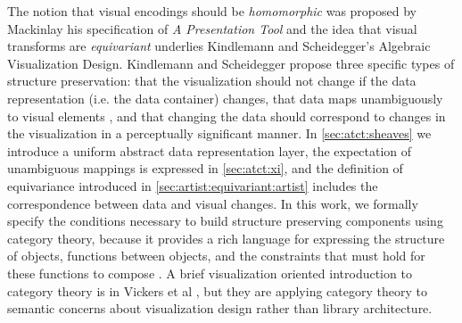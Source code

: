 \documentclass[10pt,journal,compsoc]{IEEEtran}
\theoremstyle{definition}
\theoremstyle{remark}
\begin{document}
The notion that visual encodings should be \textit{homomorphic} was proposed by Mackinlay\cite{mackinlayAutomaticDesignGraphical1987} his specification of \textit{A Presentation Tool} and the idea that visual transforms are \textit{equivariant} underlies Kindlemann and Scheidegger\cite{kindlmannAlgebraicProcessVisualization2014}'s Algebraic Visualization Design. Kindlemann and Scheidegger propose three specific types of structure preservation: that the visualization should not change if the data representation (i.e. the data container) changes, that data maps unambiguously to visual elements \cite{ziemkiewiczEmbeddingInformationVisualization2009}, and that changing the data should correspond to changes in the visualization in a perceptually significant manner. In \autoref{sec:atct:sheaves} we introduce a uniform abstract data representation layer, the expectation of unambiguous mappings is expressed in \autoref{sec:atct:xi}, and the definition of equivariance introduced in \autoref{sec:artist:equivariant:artist} includes the correspondence between data and visual changes. In this work, we formally specify the conditions necessary to build structure preserving components using category theory, because it provides a rich language for expressing the structure of objects, functions between objects, and the constraints that must hold for these functions to compose \cite{wielsManagementEvolvingSpecifications1998,yorgeyMonoidsThemeVariations}. A brief visualization oriented introduction to category theory is in Vickers et al \cite{vickersUnderstandingVisualizationFormal2013}, but they are applying category theory to semantic concerns about visualization design rather than library architecture. 
\end{document}
